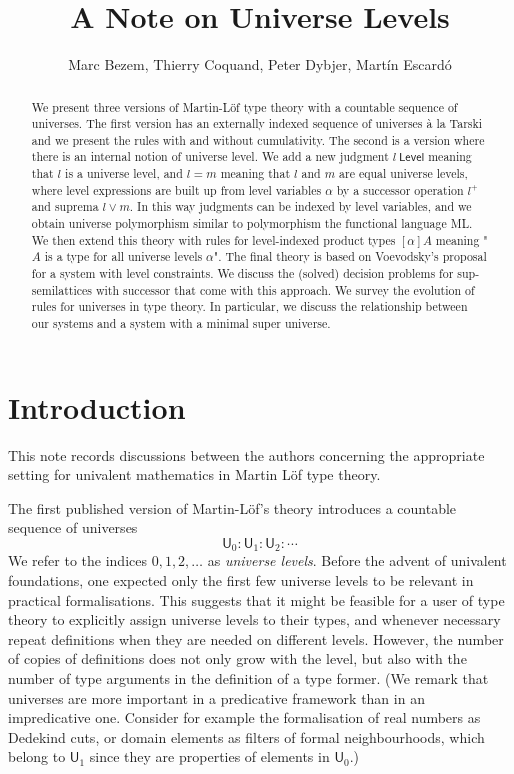 \documentclass[11pt,a4paper]{article}
\def\UU{\mathsf{U}}
\def\Level{\mathsf{Level}}
\begin{document}
\title{A Note on Universe Levels}

\author{Marc Bezem, Thierry Coquand, Peter Dybjer, Mart\'in Escard\'o}
\date{}
\maketitle

\begin{abstract}
We present three versions of Martin-Löf type theory with a countable sequence of universes. The first version has an externally indexed sequence of universes \`a la Tarski and we present the rules with and without cumulativity. The second is a version where there is an internal notion of universe level. We add a new judgment $l\ \Level$ meaning that $l$ is a universe level, and $l = m$ meaning that $l$ and $m$ are equal universe levels, where level expressions are built up from level variables $\alpha$ by a successor operation $l^+$ and suprema $l \vee m$. In this way judgments can be indexed by level variables, and we obtain universe polymorphism similar to polymorphism the functional language ML. 
We then extend this theory with rules for level-indexed product types $[\alpha]A$ meaning "$A$ is a type for all universe levels $\alpha$". The final theory is based on Voevodsky's proposal for a system with level constraints. We discuss the (solved) decision problems for sup-semilattices with 
successor that come with this approach. We survey the evolution of rules for universes in type theory. In particular, we discuss the relationship between our systems and a system with a minimal super universe.
\end{abstract}


\section{Introduction}\label{sec:intros}

This note records discussions between the authors concerning the appropriate setting for univalent mathematics in Martin Löf type theory. 

The first published version of Martin-Löf's theory \cite{martinlof:predicative} introduces a countable sequence of universes
$$
\UU_0 : \UU_1 : \UU_2 : \cdots
$$
We refer to the indices $0, 1, 2, \ldots$ as {\em universe levels}. Before the advent of univalent foundations, one expected only the first few universe levels to be relevant in practical formalisations. This suggests that it might be feasible for a user of type theory to explicitly assign universe levels to their types, and whenever necessary repeat definitions when they are needed on different levels. However, the number of copies of definitions does not only grow with the level, but also with the number of type arguments in the definition of a type former. (We remark that universes are more important in a predicative framework than in an impredicative one. Consider for example the formalisation of real numbers as Dedekind cuts, or domain elements as filters of formal neighbourhoods, which belong to $\UU_1$ since they are properties of elements in $\UU_0$.)
\end{document}

